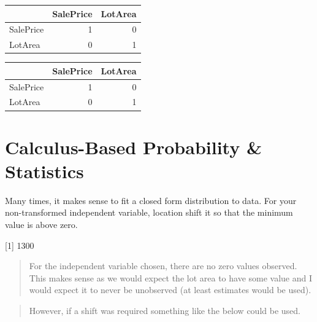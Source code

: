 \documentclass[]{article}
\newenvironment{Shaded}{\begin{snugshade}}{\end{snugshade}}
\newcommand{\KeywordTok}[1]{\textcolor[rgb]{0.13,0.29,0.53}{\textbf{{#1}}}}
\newcommand{\DecValTok}[1]{\textcolor[rgb]{0.00,0.00,0.81}{{#1}}}
\newcommand{\StringTok}[1]{\textcolor[rgb]{0.31,0.60,0.02}{{#1}}}
\newcommand{\NormalTok}[1]{{#1}}
\begin{document}
\begin{longtable}[]{@{}lrr@{}}
\toprule
& SalePrice & LotArea\tabularnewline
\midrule
\endhead
SalePrice & 1 & 0\tabularnewline
LotArea & 0 & 1\tabularnewline
\bottomrule
\end{longtable}

\begin{Shaded}
\end{Shaded}

\begin{longtable}[]{@{}lrr@{}}
\toprule
& SalePrice & LotArea\tabularnewline
\midrule
\endhead
SalePrice & 1 & 0\tabularnewline
LotArea & 0 & 1\tabularnewline
\bottomrule
\end{longtable}

\section{Calculus-Based Probability \&
Statistics}\label{calculus-based-probability-statistics}

Many times, it makes sense to fit a closed form distribution to data.
For your non-transformed independent variable, location shift it so that
the minimum value is above zero.

\begin{Shaded}
\end{Shaded}

{[}1{]} 1300

\begin{quote}
For the independent variable chosen, there are no zero values observed.
This makes sense as we would expect the lot area to have some value and
I would expect it to never be unobserved (at least estimates would be
used).
\end{quote}

\begin{quote}
However, if a shift was required something like the below could be used.
\end{quote}

\begin{Shaded}
\end{Shaded}
\end{document}
